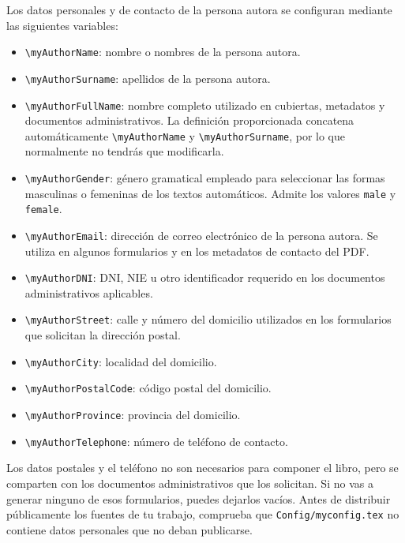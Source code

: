 Los datos personales y de contacto de la persona autora se configuran mediante las siguientes variables:

\begin{itemize}
  \item \texttt{\textbackslash{}myAuthorName}: nombre o nombres de la persona autora.
  \item \texttt{\textbackslash{}myAuthorSurname}: apellidos de la persona autora.
  \item \texttt{\textbackslash{}myAuthorFullName}: nombre completo utilizado en cubiertas, metadatos y documentos administrativos. La definición proporcionada concatena automáticamente \texttt{\textbackslash{}myAuthorName} y \texttt{\textbackslash{}myAuthorSurname}, por lo que normalmente no tendrás que modificarla.
  \item \texttt{\textbackslash{}myAuthorGender}: género gramatical empleado para seleccionar las formas masculinas o femeninas de los textos automáticos. Admite los valores \texttt{male} y \texttt{female}.
  \item \texttt{\textbackslash{}myAuthorEmail}: dirección de correo electrónico de la persona autora. Se utiliza en algunos formularios y en los metadatos de contacto del PDF.
  \item \texttt{\textbackslash{}myAuthorDNI}: DNI, NIE u otro identificador requerido en los documentos administrativos aplicables.
  \item \texttt{\textbackslash{}myAuthorStreet}: calle y número del domicilio utilizados en los formularios que solicitan la dirección postal.
  \item \texttt{\textbackslash{}myAuthorCity}: localidad del domicilio.
  \item \texttt{\textbackslash{}myAuthorPostalCode}: código postal del domicilio.
  \item \texttt{\textbackslash{}myAuthorProvince}: provincia del domicilio.
  \item \texttt{\textbackslash{}myAuthorTelephone}: número de teléfono de contacto.
\end{itemize}

Los datos postales y el teléfono no son necesarios para componer el libro, pero se comparten con los documentos administrativos que los solicitan. Si no vas a generar ninguno de esos formularios, puedes dejarlos vacíos. Antes de distribuir públicamente los fuentes de tu trabajo, comprueba que \texttt{Config/myconfig.tex} no contiene datos personales que no deban publicarse.

